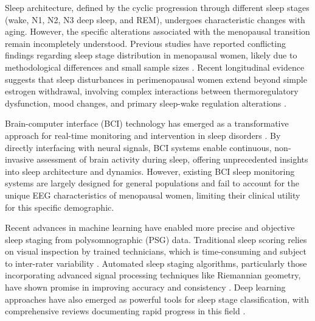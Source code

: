 \documentclass[a4paper,fleqn]{cas-dc}
\begin{document}
Sleep architecture, defined by the cyclic progression through different sleep stages (wake, N1, N2, N3 deep sleep, and REM), undergoes characteristic changes with aging. However, the specific alterations associated with the menopausal transition remain incompletely understood. Previous studies have reported conflicting findings regarding sleep stage distribution in menopausal women, likely due to methodological differences and small sample sizes \cite{Woods2010, Baker2007}. Recent longitudinal evidence suggests that sleep disturbances in perimenopausal women extend beyond simple estrogen withdrawal, involving complex interactions between thermoregulatory dysfunction, mood changes, and primary sleep-wake regulation alterations \cite{Baker2023, Haufe2023}.

Brain-computer interface (BCI) technology has emerged as a transformative approach for real-time monitoring and intervention in sleep disorders \cite{Congedo2017}. By directly interfacing with neural signals, BCI systems enable continuous, non-invasive assessment of brain activity during sleep, offering unprecedented insights into sleep architecture and dynamics. However, existing BCI sleep monitoring systems are largely designed for general populations and fail to account for the unique EEG characteristics of menopausal women, limiting their clinical utility for this specific demographic.

Recent advances in machine learning have enabled more precise and objective sleep staging from polysomnographic (PSG) data. Traditional sleep scoring relies on visual inspection by trained technicians, which is time-consuming and subject to inter-rater variability \cite{Manber2003}. Automated sleep staging algorithms, particularly those incorporating advanced signal processing techniques like Riemannian geometry, have shown promise in improving accuracy and consistency \cite{Barachant2013, Congedo2017}. Deep learning approaches have also emerged as powerful tools for sleep stage classification, with comprehensive reviews documenting rapid progress in this field \cite{Phan2021, Fiorillo2019}.
\end{document}
